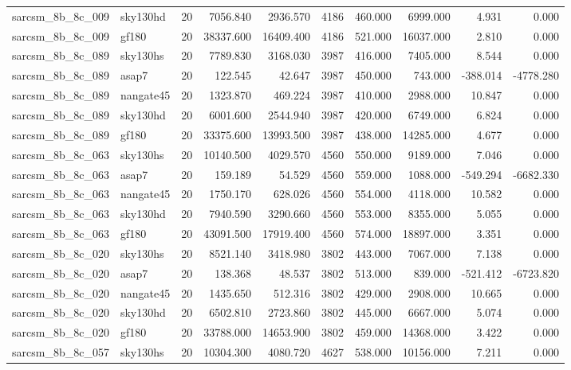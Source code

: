 \begin{tabular}{llrrrrrrrr}
sarcsm\_8b\_8c\_009 & sky130hd & 20 & 7056.840 & 2936.570 & 4186 & 460.000 & 6999.000 & 4.931 & 0.000 \\
sarcsm\_8b\_8c\_009 & gf180 & 20 & 38337.600 & 16409.400 & 4186 & 521.000 & 16037.000 & 2.810 & 0.000 \\
sarcsm\_8b\_8c\_089 & sky130hs & 20 & 7789.830 & 3168.030 & 3987 & 416.000 & 7405.000 & 8.544 & 0.000 \\
sarcsm\_8b\_8c\_089 & asap7 & 20 & 122.545 & 42.647 & 3987 & 450.000 & 743.000 & -388.014 & -4778.280 \\
sarcsm\_8b\_8c\_089 & nangate45 & 20 & 1323.870 & 469.224 & 3987 & 410.000 & 2988.000 & 10.847 & 0.000 \\
sarcsm\_8b\_8c\_089 & sky130hd & 20 & 6001.600 & 2544.940 & 3987 & 420.000 & 6749.000 & 6.824 & 0.000 \\
sarcsm\_8b\_8c\_089 & gf180 & 20 & 33375.600 & 13993.500 & 3987 & 438.000 & 14285.000 & 4.677 & 0.000 \\
sarcsm\_8b\_8c\_063 & sky130hs & 20 & 10140.500 & 4029.570 & 4560 & 550.000 & 9189.000 & 7.046 & 0.000 \\
sarcsm\_8b\_8c\_063 & asap7 & 20 & 159.189 & 54.529 & 4560 & 559.000 & 1088.000 & -549.294 & -6682.330 \\
sarcsm\_8b\_8c\_063 & nangate45 & 20 & 1750.170 & 628.026 & 4560 & 554.000 & 4118.000 & 10.582 & 0.000 \\
sarcsm\_8b\_8c\_063 & sky130hd & 20 & 7940.590 & 3290.660 & 4560 & 553.000 & 8355.000 & 5.055 & 0.000 \\
sarcsm\_8b\_8c\_063 & gf180 & 20 & 43091.500 & 17919.400 & 4560 & 574.000 & 18897.000 & 3.351 & 0.000 \\
sarcsm\_8b\_8c\_020 & sky130hs & 20 & 8521.140 & 3418.980 & 3802 & 443.000 & 7067.000 & 7.138 & 0.000 \\
sarcsm\_8b\_8c\_020 & asap7 & 20 & 138.368 & 48.537 & 3802 & 513.000 & 839.000 & -521.412 & -6723.820 \\
sarcsm\_8b\_8c\_020 & nangate45 & 20 & 1435.650 & 512.316 & 3802 & 429.000 & 2908.000 & 10.665 & 0.000 \\
sarcsm\_8b\_8c\_020 & sky130hd & 20 & 6502.810 & 2723.860 & 3802 & 445.000 & 6667.000 & 5.074 & 0.000 \\
sarcsm\_8b\_8c\_020 & gf180 & 20 & 33788.000 & 14653.900 & 3802 & 459.000 & 14368.000 & 3.422 & 0.000 \\
sarcsm\_8b\_8c\_057 & sky130hs & 20 & 10304.300 & 4080.720 & 4627 & 538.000 & 10156.000 & 7.211 & 0.000 \\

\end{tabular}
